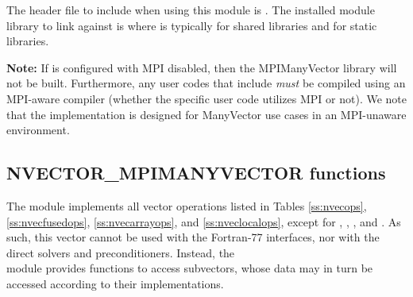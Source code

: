 The header file to include when using this module is
. The installed module library to link against is
 where  is typically
 for shared libraries and  for static libraries.

\warn\textbf{Note:} If {\sundials} is configured with MPI disabled, then the
MPIManyVector library will not be built.  Furthermore, any user codes
that include  \emph{must} be compiled
using an MPI-aware compiler (whether the specific user code utilizes
MPI or not).  We note that the {\nvecmanyvector} implementation is
designed for ManyVector use cases in an MPI-unaware environment.


\subsection{NVECTOR\_MPIMANYVECTOR functions}
\label{ss:nvec_mpimanyvector_functions}

The {\nvecmpimanyvector} module implements all vector operations listed 
in Tables \ref{ss:nvecops}, \ref{ss:nvecfusedops}, \ref{ss:nvecarrayops},
and \ref{ss:nveclocalops}, except for ,
, , and
.  As such, this vector cannot be
used with the {\sundials} Fortran-77 interfaces, nor with the
{\sundials} direct solvers and preconditioners. Instead, the \\
{\nvecmpimanyvector} module provides functions to access subvectors,
whose data may in turn be accessed according to their {\nvector}
implementations.

